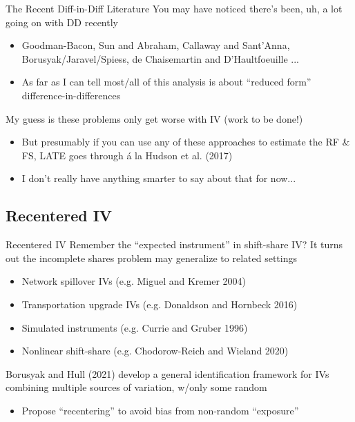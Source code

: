 \documentclass{beamer}
\begin{document}
\begin{frame}{The Recent Diff-in-Diff Literature}
You may have noticed there's been, uh, a lot going on with DD recently\smallskip
\begin{itemize}
\item Goodman-Bacon, Sun and Abraham, Callaway and Sant'Anna, Borusyak/Jaravel/Spiess, de Chaisemartin and D'Haultfoeuille ...\smallskip
\item As far as I can tell most/all of this analysis is about ``reduced form'' difference-in-differences
\end{itemize}\medskip\pause{}
My guess is these problems only get worse with IV (work to be done!)\smallskip
\begin{itemize}
\item But presumably if you can use any of these approaches to estimate the RF \& FS, LATE goes through \'{a} la Hudson et al. (2017)\smallskip
\item I don't really have anything smarter to say about that for now...
\end{itemize}
\end{frame}

\subsection{Recentered IV}
\begin{frame}{Recentered IV}
Remember the ``expected instrument'' in shift-share IV? It turns out the incomplete shares problem may generalize to related settings\smallskip
\begin{itemize}
\item Network spillover IVs (e.g. Miguel and Kremer 2004)\smallskip
\item Transportation upgrade IVs (e.g. Donaldson and Hornbeck 2016)\smallskip
\item Simulated instruments (e.g. Currie and Gruber 1996)\smallskip
\item Nonlinear shift-share (e.g. Chodorow-Reich and Wieland 2020)
\end{itemize}\bigskip\pause{}

Borusyak and Hull (2021) develop a general identification framework for IVs combining multiple sources of variation, w/only some random\smallskip
\begin{itemize}
\item Propose ``recentering'' to avoid bias from non-random ``exposure''
\end{itemize}
\end{frame}
\end{document}
